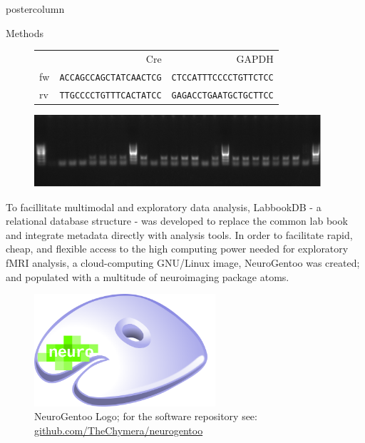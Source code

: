 \documentclass{beamer}
\begin{document}
\begin{frame}
\begin{columns}
\begin{column}{.48\textwidth}
\begin{beamercolorbox}[center]{postercolumn}
{\begin{myblock}{Methods}
\begin{figure}
\begin{minipage}{.45\textwidth}
\begin{tabular}{@{} p{.1\linewidth} r r @{}}
									\cmidrule(l){2-3}
									&   Cre       & GAPDH  \\
									\cmidrule(lr){1-3}
									fw &   \texttt{ACCAGCCAGCTATCAACTCG} & \texttt{CTCCATTTCCCCTGTTCTCC}    \\
									rv &   \texttt{TTGCCCCTGTTTCACTATCC} & \texttt{GAGACCTGAATGCTGCTTCC}    \\
									\bottomrule
								\end{tabular}
							\end{minipage}
							\begin{minipage}{.45\textwidth}
								\centering\includegraphics[width=0.95\textwidth]{img/ag1}
							\end{minipage}
						\end{figure}
						\vspace{1em}
						To facillitate multimodal and exploratory data analysis,
						LabbookDB - a relational database structure - was developed to
						replace the common lab book and integrate metadata directly with
						analysis tools.
						In order to facilitate rapid, cheap, and flexible access to the
						high computing power needed for exploratory fMRI analysis, a
						cloud-computing GNU/Linux image, NeuroGentoo was created;
						and populated with a multitude of neuroimaging package atoms.
						\vspace{0.5em}
						\begin{figure}
							\begin{minipage}{0.43\textwidth}
								\centering\includegraphics[width=0.6\textwidth]{img/ng_large.png}
								\caption{NeuroGentoo Logo; for the software repository see:
										\href{https://github.com/TheChymera/neurogentoo}{github.com/TheChymera/neurogentoo}}

\end{minipage}
\end{figure}
\end{myblock}}
\end{beamercolorbox}
\end{column}
\end{columns}
\end{frame}
\end{document}
